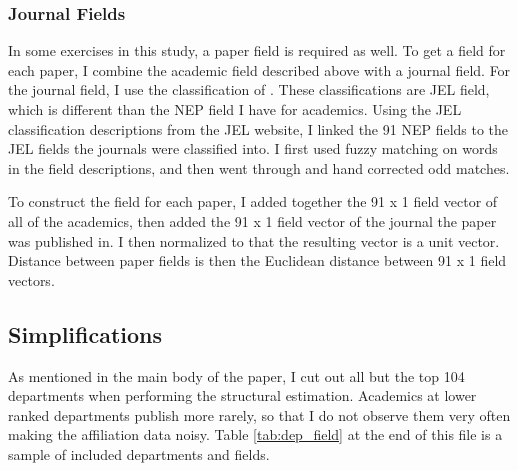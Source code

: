\documentclass[]{article}
\begin{document}
\subsubsection{Journal Fields}

In some exercises in this study, a paper field is required as well. To
get a field for each paper, I combine the academic field described above
with a journal field. For the journal field, I use the classification of
\citet{barrett2000subdiscipline}. These classifications are JEL field,
which is different than the NEP field I have for academics. Using the JEL
classification descriptions from the JEL website, I linked the 91 NEP
fields to the JEL fields the journals were classified into. I first used
fuzzy matching on words in the field descriptions, and then went through
and hand corrected odd matches.

To construct the field for each paper, I added together the 91 x 1 field
vector of all of the academics, then added the 91 x 1 field vector of the
journal the paper was published in. I then normalized to that the
resulting vector is a unit vector. Distance between paper fields is then
the Euclidean distance between 91 x 1 field vectors.

\subsection{Simplifications}

As mentioned in the main body of the paper, I cut out all but the
top 104 departments when performing the structural estimation. Academics
at lower ranked departments publish more rarely, so that I do not
observe them very often making the affiliation data noisy. Table \ref{tab:dep_field} at
the end of this file is a sample of included departments and fields.
\end{document}
